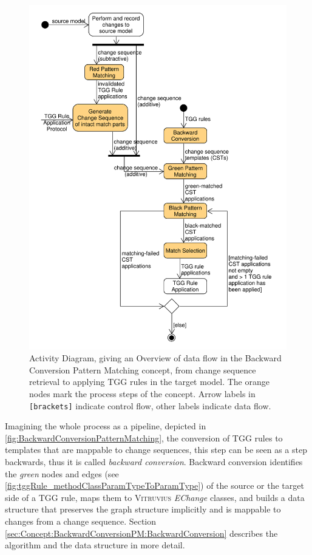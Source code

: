 \begin{figure}
\centering
\includegraphics[width=15cm]{figures/Backward-Conversion-Pattern-Matching.pdf}
\caption[Data flow in the Backward Conversion Pattern Matching concept]{Activity Diagram, giving an Overview of data flow in the Backward Conversion Pattern Matching concept, from change sequence retrieval to applying TGG rules in the target model. The orange nodes mark the process steps of the concept. Arrow labels in \texttt{[brackets]} indicate control flow, other labels indicate data flow.}
\label{fig:BackwardConversionPatternMatching}
\end{figure}

Imagining the whole process as a pipeline, depicted in \autoref{fig:BackwardConversionPatternMatching}, the conversion of TGG rules to templates that are mappable to change sequences, this step can be seen as a step backwards, thus it is called \emph{backward conversion}.
Backward conversion identifies the \emph{green} nodes and edges (see \autoref{fig:tggRule_methodClassParamTypeToParamType}) of the source or the target side of a TGG rule, maps them to \textsc{Vitruvius} \emph{EChange} classes, and builds a data structure that preserves the graph structure implicitly and is mappable to changes from a change sequence.
Section \ref{sec:Concept:BackwardConversionPM:BackwardConversion} describes the algorithm and the data structure in more detail.

